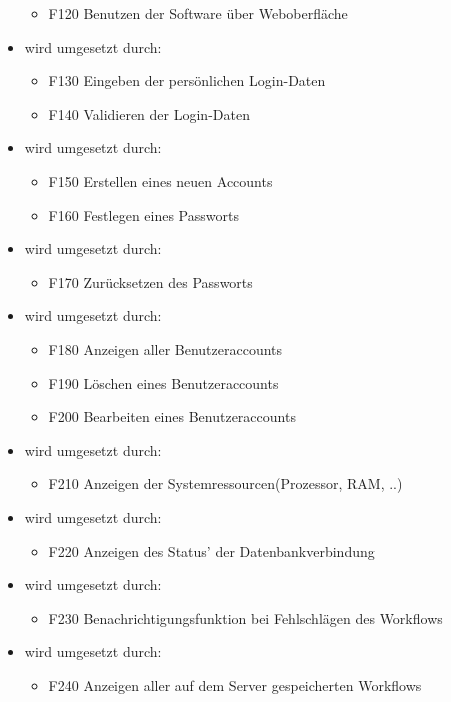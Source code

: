 \begin{itemize}
\begin{itemize}
            \item F120 Benutzen der Software über Weboberfläche
        \end{itemize}
        \item {} wird umgesetzt durch:
        \begin{itemize}
            \item F130 Eingeben der persönlichen Login-Daten
            \item F140 Validieren der Login-Daten
        \end{itemize}
        \item {} wird umgesetzt durch:
        \begin{itemize}
            \item F150 Erstellen eines neuen Accounts
            \item F160 Festlegen eines Passworts
        \end{itemize}
        \item {} wird umgesetzt durch:
        \begin{itemize}
            \item F170 Zurücksetzen des Passworts
        \end{itemize}
        \item {} wird umgesetzt durch:
        \begin{itemize}
            \item F180 Anzeigen aller Benutzeraccounts
            \item F190 Löschen eines Benutzeraccounts
            \item F200 Bearbeiten eines Benutzeraccounts
        \end{itemize}
        \item {} wird umgesetzt durch:
        \begin{itemize}
            \item F210 Anzeigen der Systemressourcen(Prozessor, RAM, ..)
        \end{itemize}
        \item {} wird umgesetzt durch:
        \begin{itemize}
            \item F220 Anzeigen des Status' der Datenbankverbindung
        \end{itemize}
        \item {} wird umgesetzt durch:
        \begin{itemize}
            \item F230 Benachrichtigungsfunktion bei Fehlschlägen des Workflows
        \end{itemize}
        \item {} wird umgesetzt durch:
        \begin{itemize}
            \item F240 Anzeigen aller auf dem Server gespeicherten Workflows
        \end{itemize}
        
    \end{itemize}
\newpage